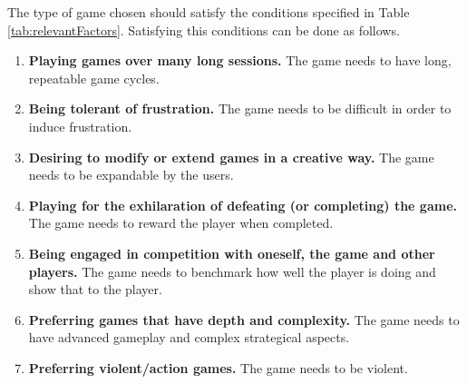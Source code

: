 The type of game chosen should satisfy the conditions specified in Table \ref{tab:relevantFactors}.
Satisfying this conditions can be done as follows.
\begin{enumerate}
\item \textbf{Playing games over many long sessions.} The game needs to have long, repeatable game cycles.
\item \textbf{Being tolerant of frustration.} The game needs to be difficult in order to induce frustration.
\item \textbf{Desiring to modify or extend games in a creative way.} The game needs to be expandable by the users.
\item \textbf{Playing for the exhilaration of defeating (or completing) the game.} The game needs to reward the player when completed.
\item \textbf{Being engaged in competition with oneself, the game and other players.} The game needs to benchmark how well the player is doing and show that to the player.
\item \textbf{Preferring games that have depth and complexity.} The game needs to have advanced gameplay and complex strategical aspects.
\item \textbf{Preferring violent/action games.} The game needs to be violent.
\end{enumerate}




